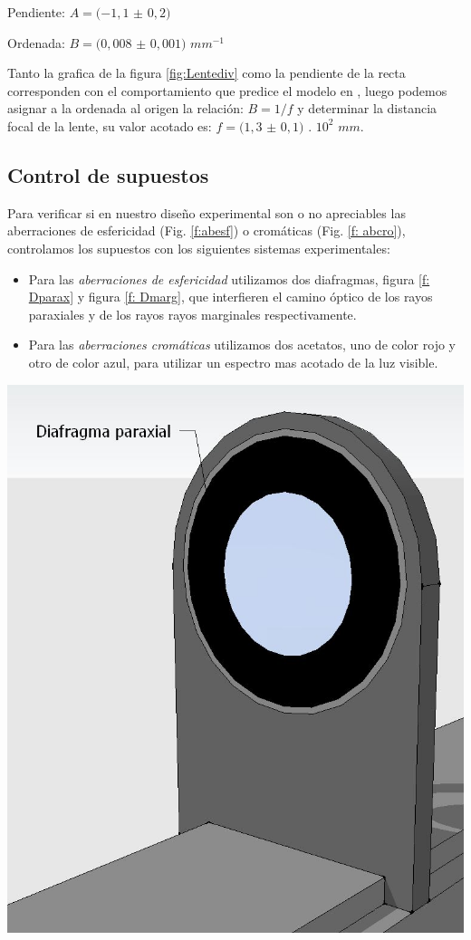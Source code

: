 \documentclass[a4paper,12pt]{article}
\newenvironment{Figure}
  {\par\medskip\noindent\minipage{\linewidth}}
  {\endminipage\par\medskip}
\begin{document}
\begin{multicols*}{2}
        Pendiente: $A=(-1,1$ $\pm$ $0,2)$

        Ordenada: $B=(0,008$ $\pm$ $0,001)$ $mm^{-1}$

        Tanto la grafica de la figura \ref{fig:Lentediv} como la pendiente de la recta corresponden con el comportamiento que predice el modelo en , luego podemos asignar a la ordenada al origen la relación: $B=1/f$ y determinar la distancia focal de la lente, su valor acotado es: $f=(1,3$ $\pm$ $0,1)$ . $10^{2}$ $mm$.
 
    \subsection*{Control de supuestos}

        Para verificar si en nuestro diseño experimental son o no apreciables las aberraciones de esfericidad (Fig. \ref{f:abesf}) o cromáticas (Fig. \ref{f: abcro}), controlamos los supuestos con los siguientes sistemas experimentales:

        \begin{itemize}
            \item Para las \emph{aberraciones de esfericidad} utilizamos dos diafragmas, figura \ref{f: Dparax} y figura \ref{f: Dmarg}, que interfieren el camino óptico de los rayos paraxiales y de los rayos rayos marginales respectivamente.
            \item Para las \emph{aberraciones cromáticas} utilizamos dos acetatos, uno de color rojo y otro de color azul, para utilizar un espectro mas acotado de la luz visible.
        \end{itemize}

        \begin{Figure}
            \centering
            \includegraphics[width=0.7\linewidth]{DiafragmaParaxial.jpg}
            \label{f: Dparax}
        \end{Figure}


\end{multicols*}
\end{document}
